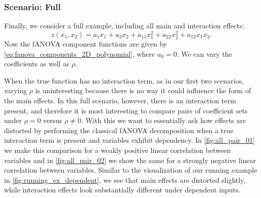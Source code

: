 \subsubsection{Scenario: Full}
Finally, we consider a full example, including all main and interaction effects:
$$z(x_1, x_2) = a_1 x_1 + a_2 x_2 + a_{11} x_1^2 + a_{22} x_2^2 + a_{12} x_1 x_2.$$
Now the fANOVA component functions are given by \autoref{eq:fanova_components_2D_polynomial}, where $a_0 = 0$.
We can vary the coefficients as well as $\rho$.\par
When the true function has no interaction term, as in our first two scenarios, varying $\rho$ is uninteresting because there is no way it could influence the form of the main effects. In this full scenario, however, there is an interaction term present, and therefore it is most interesting to compare pairs of coefficient sets under $\rho = 0$ versus $\rho \neq 0$. With this we want to essentially ask how effects are distorted by performing the classical fANOVA decomposition when a true interaction term is present and variables exhibit dependency.
In \autoref{fig:all_pair_01} we make this comparison for a weakly positive linear correlation between variables and in \autoref{fig:all_pair_02} we show the same for a strongly negative linear correlation between variables. Similar to the visualization of our running example in \autoref{fig:running_ex_dependent}, we see that main effects are distorted slightly, while interaction effects look substantially different under dependent inputs.

